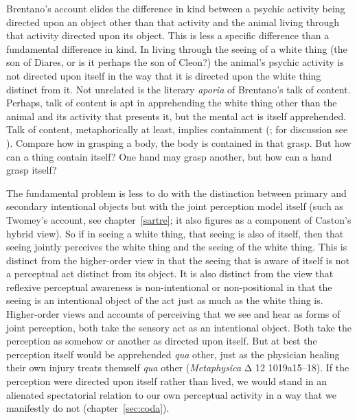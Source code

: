Brentano's account elides the difference in kind between a psychic activity being directed upon an object other than that activity and the animal living through that activity directed upon its object. This is less a specific difference than a fundamental difference in kind. In living through the seeing of a white thing (the son of Diares, or is it perhaps the son of Cleon?) the animal's psychic activity is not directed upon itself in the way that it is directed upon the white thing distinct from it. Not unrelated is the literary \emph{aporia} of Brentano's talk of content. Perhaps, talk of content is apt in apprehending the white thing other than the animal and its activity that presents it, but the mental act is itself apprehended. Talk of content, metaphorically at least, implies containment (\citealt{Martin:1998nx}; for discussion see \citealt[xii–xiii, 2]{Kalderon:2018oe}). Compare how in grasping a bo{}dy, the body is contained in that grasp. But how can a thing contain itself? One hand may grasp another, but how can a hand grasp itself?

The fundamental problem is less to do with the distinction between  primary and secondary intentional objects but with the joint perception model itself (such as Twomey's \citeyear{Twomey:2019aa} account, see chapter~\ref{sartre}; it also figures as a component of Caston's \citeyear{caston02} hybrid view). So if in seeing a white thing, that seeing is also of itself, then that seeing jointly perceives the white thing and the seeing of the white thing. This is distinct from the higher-order view in that the seeing that is aware of itself is not a perceptual act distinct from its object. It is also distinct from the view that reflexive perceptual awareness is non-intentional or non-positional in that the seeing is an intentional object of the act just as much as the white thing is. Higher-order views and accounts of perceiving that we see and hear as forms of joint perception, both take the sensory act as an intentional object. Both take the perception as somehow or another as directed upon itself. But at best the perception itself would be apprehended \emph{qua} other, just as the physician healing their own injury treats themself \emph{qua} other (\emph{Metaphysica} {\sbl Δ} 12 1019a15–18). If the perception were directed upon itself rather than lived, we would stand in an alienated spectatorial relation to our own perceptual activity in a way that we manifestly do not (chapter~\ref{sec:coda}).

